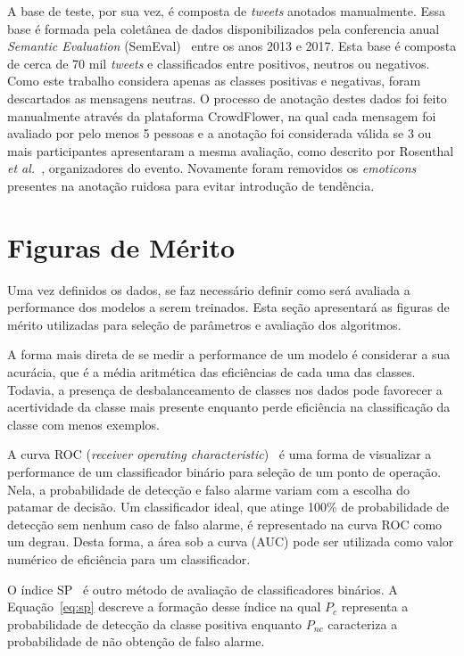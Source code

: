 A base de teste, por sua vez, é composta de \textit{tweets} anotados manualmente.
Essa base é formada pela coletânea de dados disponibilizados pela conferencia anual \textit{Semantic Evaluation}
(SemEval)~\cite{semeval17} entre os anos 2013 e 2017.
Esta base é composta de cerca de 70 mil \textit{tweets} e classificados entre positivos, neutros ou negativos.
Como este trabalho considera apenas as classes positivas e negativas, foram descartados as mensagens neutras.
O processo de anotação destes dados foi feito manualmente através da plataforma CrowdFlower, na qual cada mensagem
foi avaliado por pelo menos 5 pessoas e a anotação foi considerada válida se 3 ou mais participantes apresentaram a
mesma avaliação, como descrito por Rosenthal \textit{et al.}~\cite{rosenthal17}, organizadores do evento.
Novamente foram removidos os \textit{emoticons} presentes na anotação ruidosa para evitar introdução de tendência.

\section{Figuras de Mérito} \label{sec:metrics}

Uma vez definidos os dados, se faz necessário definir como será avaliada a performance dos modelos a serem treinados.
Esta seção apresentará as figuras de mérito utilizadas para seleção de parâmetros e avaliação dos algoritmos.

A forma mais direta de se medir a performance de um modelo é considerar a sua acurácia, que é a média aritmética das
eficiências de cada uma das classes.
Todavia, a presença de desbalanceamento de classes nos dados pode favorecer a acertividade da classe mais presente
enquanto perde eficiência na classificação da classe com menos exemplos.

A curva ROC (\textit{receiver operating characteristic})~\cite{bradley97} é uma forma de visualizar a performance de um
classificador binário para seleção de um ponto de operação.
Nela, a probabilidade de detecção e falso alarme variam com a escolha do patamar de decisão.
Um classificador ideal, que atinge 100\% de probabilidade de detecção sem nenhum caso de falso alarme, é representado na
curva ROC como um degrau.
Desta forma, a área sob a curva (AUC) pode ser utilizada como valor numérico de eficiência para um classificador.

O índice SP~\cite{ciodaro12} é outro método de avaliação de classificadores binários.
A Equação~\ref{eq:sp} descreve a formação desse índice na qual $P_c$ representa a probabilidade de detecção da classe
positiva enquanto $P_{nc}$ caracteriza a probabilidade de não obtenção de falso alarme.

